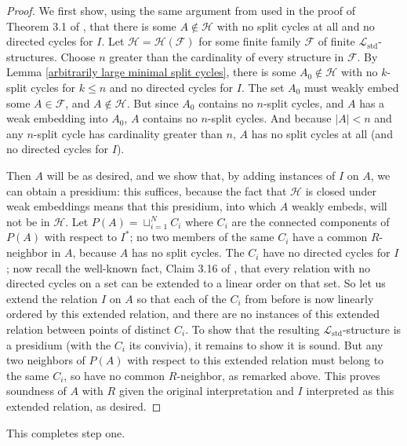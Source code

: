 \documentclass{amsart}
\theoremstyle{definition}
\theoremstyle{remark}
\numberwithin{equation}{section}
\begin{document}
\begin{proof}
We first show, using the same argument from \cite{LZ17} used in the proof of Theorem 3.1 of \cite{ApproxOrder}, that there is some $A \notin \mathcal{H}$ with no split cycles at all and no directed cycles for $I$. Let $\mathcal{H} = \mathcal{H}(\mathcal{F})$ for some finite family $\mathcal{F}$ of finite $\mathcal{L}_{\mathrm{std}}$-structures. Choose $n$ greater than the cardinality of every structure in $\mathcal{F}$. By Lemma \ref{arbitrarily large minimal split cycles}, there is some $A_0 \notin \mathcal{H}$ with no $k$-split cycles for $k \leq n$ and no directed cycles for $I$. The set $A_0$ must weakly embed some $A \in \mathcal{F}$, and $A \notin \mathcal{H}$. But since $A_{0}$ contains no $n$-split cycles, and $A$ has a weak embedding into $A_0$, $A$ contains no $n$-split cycles. And because $|A| < n$ and any $n$-split cycle has cardinality greater than $n$, $A$ has no split cycles at all (and no directed cycles for $I$).

Then $A$ will be as desired, and we show that, by adding instances of $I$ on $A$, we can obtain a presidium: this suffices, because the fact that $\mathcal{H}$ is closed under weak embeddings means that this presidium, into which $A$ weakly embeds, will not be in $\mathcal{H}$. Let $P(A) = \sqcup^{N}_{i =1} C_i$ where $C_i$ are the connected components of $P(A)$ with respect to $I^{*}$; no two members of the same $C_i$ have a common $R$-neighbor in $A$, because $A$ has no split cycles. The $C_{i}$ have no directed cycles for $I$; now recall the well-known fact, Claim 3.16 of \cite{ApproxOrder}, that every relation with no directed cycles on a set can be extended to a linear order on that set. So let us extend the relation $I$ on $A$ so that each of the $C_i$ from before is now linearly ordered by this extended relation, and there are no instances of this extended relation between points of distinct $C_i$. To show that the resulting $\mathcal{L}_{\mathrm{std}}$-structure is a presidium (with the $C_i$ its convivia), it remains to show it is sound. But  any two neighbors of $P(A)$ with respect to this extended relation must belong to the same $C_i$, so have no common $R$-neighbor, as remarked above. This proves soundness of $A$ with $R$ given the original interpretation and $I$ interpreted as this extended relation, as desired.
\end{proof}

This completes step one.
\end{document}
